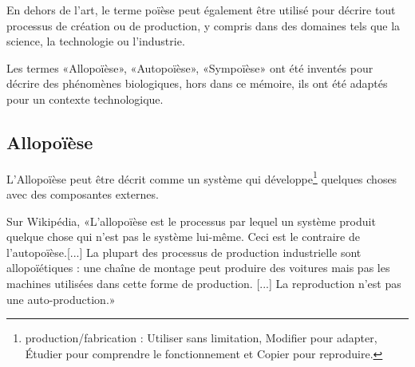 En dehors de l'art, le terme poïèse peut également être utilisé pour décrire tout processus de création ou de production, y compris dans des domaines tels que la science, la technologie ou l'industrie.

Les termes «Allopoïèse», «Autopoïèse», «Sympoïèse» ont été inventés pour décrire des phénomènes biologiques, hors dans ce mémoire, ils ont été adaptés pour un contexte technologique.

\subsection{Allopoïèse}

L'Allopoïèse peut être décrit comme un système qui développe\footnote{production/fabrication : Utiliser sans limitation, Modifier pour adapter, Étudier pour comprendre le fonctionnement et Copier pour reproduire.} quelques choses avec des composantes externes.

Sur Wikipédia, «L'allopoïèse est le processus par lequel un système produit quelque chose qui n'est pas le système lui-même. Ceci est le contraire de l'autopoïèse.[...] La plupart des processus de production industrielle sont allopoïétiques : une chaîne de montage peut produire des voitures mais pas les machines utilisées dans cette forme de production. [...] La reproduction n'est pas une auto-production.»~\cite{wiki_allopoiesis_2018}~\cite{vuc_allopoiesis_2018}



